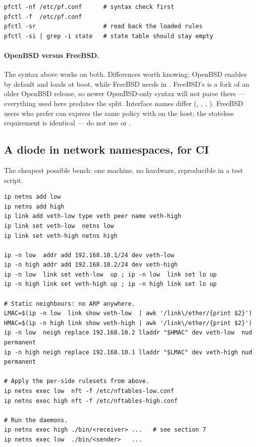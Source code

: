 \documentclass[11pt,a4paper]{article}
\begin{document}
\begin{lstlisting}[style=shell]
pfctl -nf /etc/pf.conf      # syntax check first
pfctl -f  /etc/pf.conf
pfctl -sr                   # read back the loaded rules
pfctl -si | grep -i state   # state table should stay empty
\end{lstlisting}

\paragraph{OpenBSD versus FreeBSD.} The syntax above works on both.
Differences worth knowing: OpenBSD enables  by default and loads
 at boot, while FreeBSD needs  in
. FreeBSD's  is a fork of an older OpenBSD
release, so newer OpenBSD-only syntax will not parse there --- everything used
here predates the split. Interface names differ (, ,
, ). FreeBSD users who prefer  can express the
same policy with  on the
\srcside{} host; the stateless requirement is identical --- do not use
 or .

\subsection{A diode in network namespaces, for CI}

The cheapest possible bench: one machine, no hardware, reproducible in a test
script.

\begin{lstlisting}[style=shell]
ip netns add low
ip netns add high
ip link add veth-low type veth peer name veth-high
ip link set veth-low  netns low
ip link set veth-high netns high

ip -n low  addr add 192.168.10.1/24 dev veth-low
ip -n high addr add 192.168.10.2/24 dev veth-high
ip -n low  link set veth-low  up ; ip -n low  link set lo up
ip -n high link set veth-high up ; ip -n high link set lo up

# Static neighbours: no ARP anywhere.
LMAC=$(ip -n low  link show veth-low  | awk '/link\/ether/{print $2}')
HMAC=$(ip -n high link show veth-high | awk '/link\/ether/{print $2}')
ip -n low  neigh replace 192.168.10.2 lladdr "$HMAC" dev veth-low  nud permanent
ip -n high neigh replace 192.168.10.1 lladdr "$LMAC" dev veth-high nud permanent

# Apply the per-side rulesets from above.
ip netns exec low  nft -f /etc/nftables-low.conf
ip netns exec high nft -f /etc/nftables-high.conf

# Run the daemons.
ip netns exec high ./bin/<receiver> ...   # see section 7
ip netns exec low  ./bin/<sender>   ...
\end{lstlisting}
\end{document}
